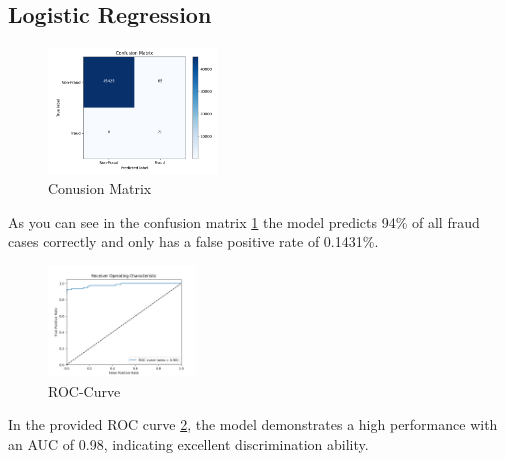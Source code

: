 \documentclass[a4, 10 pt, conference]{ieeeconf}  %
\begin{document}
\subsection{Logistic Regression}
\begin{figure}[H]
  \centering
  \includegraphics[width=0.4\textwidth]{images/confusion_matrix.png}
  \caption{Conusion Matrix}
  \label{fig:lr-confusion}
\end{figure}
As you can see in the confusion matrix \ref{fig:lr-confusion} the model predicts 94\% of all fraud cases correctly and only has a false positive rate of 0.1431\%.

\begin{figure}[!htb]
  \centering
  \includegraphics[width=0.35\textwidth]{images/roc_curve.png}
  \caption{ROC-Curve}
  \label{fig:lr-roc}
\end{figure}
In the provided ROC curve \ref{fig:lr-roc}, the model demonstrates a high performance with an AUC of 0.98, indicating excellent discrimination ability.
\end{document}

